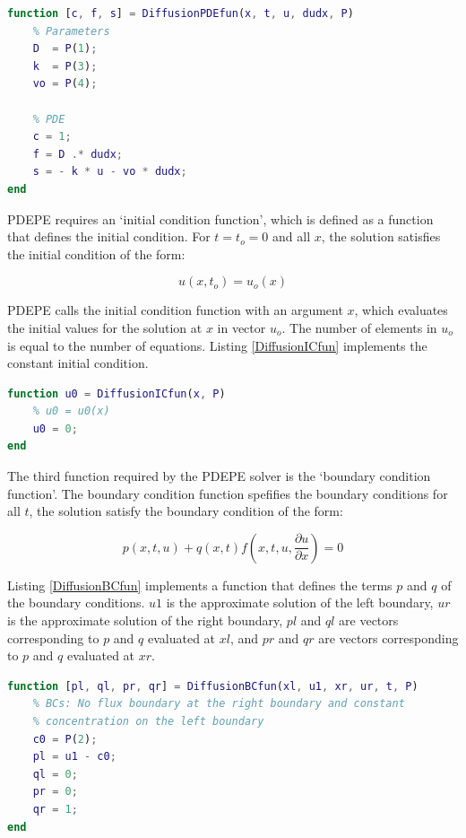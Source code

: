 \documentclass{article}
\begin{document}
\begin{lstlisting}[language=Matlab, caption=PDE function for equations, label=DiffusionPDEfun]
function [c, f, s] = DiffusionPDEfun(x, t, u, dudx, P)
    % Parameters
    D  = P(1);
    k  = P(3);
    vo = P(4);
    
    % PDE
    c = 1;
    f = D .* dudx;
    s = - k * u - vo * dudx;
end
\end{lstlisting}

PDEPE requires an `initial condition function', which is defined as a function that defines the initial condition. For $t = t_o = 0$ and all $x$, the solution satisfies the initial condition of the form:

$$ u(x, t_o) = u_o(x) $$

PDEPE calls the initial condition function with an argument $x$, which evaluates the initial values for the solution at $x$ in vector $u_o$. The number of elements in $u_o$ is equal to the number of equations. Listing \ref{DiffusionICfun} implements the constant initial condition.

\begin{lstlisting}[language=Matlab, caption=Initial condition function, label=DiffusionICfun]
function u0 = DiffusionICfun(x, P)
    % u0 = u0(x)
    u0 = 0;
end
\end{lstlisting}

The third function required by the PDEPE solver is the `boundary condition function'. The boundary condition function spefifies the boundary conditions for all $t$, the solution satisfy the boundary condition of the form:

$$ p(x, t, u) + q(x, t) f \left( x, t, u, \frac{\partial u}{\partial x} \right) = 0 $$

Listing \ref{DiffusionBCfun} implements a function that defines the terms $p$ and $q$ of the boundary conditions. $u1$ is the approximate solution of the left boundary, $ur$ is the approximate solution of the right boundary, $pl$ and $ql$ are vectors corresponding to $p$ and $q$ evaluated at $xl$, and $pr$ and $qr$ are vectors corresponding to $p$ and $q$ evaluated at $xr$.

\begin{lstlisting}[language=Matlab, caption=Boundary condition function, label=DiffusionBCfun]
function [pl, ql, pr, qr] = DiffusionBCfun(xl, u1, xr, ur, t, P)
    % BCs: No flux boundary at the right boundary and constant
    % concentration on the left boundary
    c0 = P(2);
    pl = u1 - c0;
    ql = 0;
    pr = 0;
    qr = 1;
end
\end{lstlisting}
\end{document}

